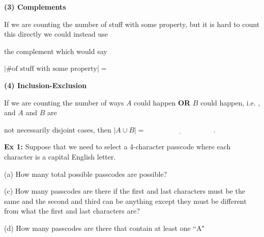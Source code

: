 \documentclass[fleqn]{article}
\newcommand{\DarkPurple}[1]{\textcolor{DarkPurple}{#1}}
\theoremstyle{definition}
\begin{document}
{{\vspace{1.5cm}

\textbf{(3) Complements} 

\vspace{.25cm}
If we are counting the number of stuff with some property, but it is hard to count this directly we could instead use 

\vspace{.25cm} 
the \DarkPurple{complement} which would say 

\vspace{.25cm} 
\hspace{1cm} $| \text{\# of stuff with some property} | =  $

\vspace{3.5cm}

\textbf{(4) Inclusion-Exclusion} 

\vspace{.25cm}
If we are counting the number of ways $A$ could happen \textbf{OR} $B$ could happen, i.e. \underline{\hspace{1.5cm}}, and $A$ and $B$ are

\vspace{.25cm} 
not necessarily disjoint cases, then $|A \cup B| = \underline{\hspace{4cm}}$. 
\vspace{3.5cm}  
}}










\newpage




\textbf{Ex 1:} Suppose that we need to select a 4-character passcode where each character is a capital English letter. 

\vspace{.25cm}
(a) How many total possible passcodes are possible?

\vspace{3cm} 

(c) How many passcodes are there if the first and last characters must be the same and the second and third can be anything except they must be different from what the first and last characters are?

\vspace{5cm} 


(d) How many passcodes are there that contain at least one ``A"
\end{document}
